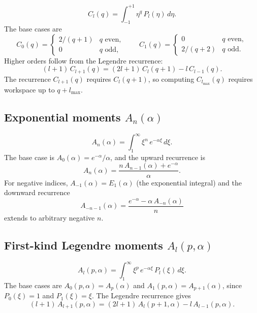 \documentclass[aps,pra,twocolumn,superscriptaddress,longbibliography]{revtex4-2}
\begin{document}
\begin{equation}
  C_l(q) = \int_{-1}^{+1}\eta^q\,P_l(\eta)\,d\eta.
  \label{eq:Cl_def}
\end{equation}
The base cases are
\begin{equation}
  C_0(q) = \begin{cases} 2/(q+1) & q\text{ even}, \\ 0 & q\text{ odd},\end{cases}
  \qquad
  C_1(q) = \begin{cases} 0 & q\text{ even}, \\ 2/(q+2) & q\text{ odd}.\end{cases}
\end{equation}
Higher orders follow from the Legendre recurrence:
\begin{equation}
  (l+1)\,C_{l+1}(q) = (2l+1)\,C_l(q+1) - l\,C_{l-1}(q).
  \label{eq:Cl_recurrence}
\end{equation}
The recurrence $C_{l+1}(q)$ requires $C_l(q+1)$, so computing
$C_{l_{\max}}(q)$ requires workspace up to $q + l_{\max}$.

\subsection{Exponential moments \texorpdfstring{$A_n(\alpha)$}{An(alpha)}}

\begin{equation}
  A_n(\alpha) = \int_1^\infty\xi^n\,e^{-\alpha\xi}\,d\xi.
  \label{eq:An_def}
\end{equation}
The base case is $A_0(\alpha) = e^{-\alpha}/\alpha$, and the
upward recurrence is
\begin{equation}
  A_n(\alpha) = \frac{n\,A_{n-1}(\alpha) + e^{-\alpha}}{\alpha}.
  \label{eq:An_recurrence}
\end{equation}
For negative indices, $A_{-1}(\alpha) = E_1(\alpha)$
(the exponential integral) and the downward recurrence
\begin{equation}
  A_{-n-1}(\alpha) = \frac{e^{-\alpha} - \alpha\,A_{-n}(\alpha)}{n}
  \label{eq:An_negative}
\end{equation}
extends to arbitrary negative $n$.

\subsection{First-kind Legendre moments
\texorpdfstring{$A_l(p, \alpha)$}{Al(p, alpha)}}

\begin{equation}
  A_l(p, \alpha) = \int_1^\infty\xi^p\,e^{-\alpha\xi}\,
  P_l(\xi)\,d\xi.
  \label{eq:Al_def}
\end{equation}
The base cases are $A_0(p,\alpha) = A_p(\alpha)$ and
$A_1(p,\alpha) = A_{p+1}(\alpha)$, since $P_0(\xi) = 1$
and $P_1(\xi) = \xi$.  The Legendre recurrence gives
\begin{equation}
  (l+1)\,A_{l+1}(p,\alpha) = (2l+1)\,A_l(p+1,\alpha) - l\,A_{l-1}(p,\alpha).
  \label{eq:Al_recurrence}
\end{equation}
\end{document}
